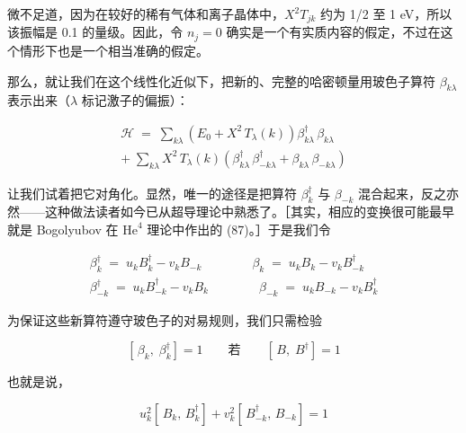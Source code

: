 
微不足道，因为在较好的稀有气体和离子晶体中，$X^{2}T_{jk}$ 约为 1/2 至 1 eV，所以该振幅是 0.1 的量级。因此，令 $n_j = 0$ 确实是一个有实质内容的假定，不过在这个情形下也是一个相当准确的假定。

那么，就让我们在这个线性化近似下，把新的、完整的哈密顿量用玻色子算符 $\beta_{k\lambda}$ 表示出来（$\lambda$ 标记激子的偏振）：

\begin{gather*}
\mathcal{H} \;=\; \sum_{k\lambda} \left(E_0 + X^{2}\,T_{\lambda}(k)\right) \beta_{k\lambda}^{\dagger}\,\beta_{k\lambda} \\
+\;\sum_{k\lambda} X^{2}\,T_{\lambda}(k)\left(\beta_{k\lambda}^{\dagger}\,\beta_{-k\lambda}^{\dagger} + \beta_{k\lambda}\,\beta_{-k\lambda}\right) \tag{17}
\end{gather*}

让我们试着把它对角化。显然，唯一的途径是把算符 $\beta_k^{\dagger}$ 与 $\beta_{-k}$ 混合起来，反之亦然——这种做法读者如今已从超导理论中熟悉了。［其实，相应的变换很可能最早就是 Bogolyubov 在 $\mathrm{He}^{4}$ 理论中作出的 (87)。］于是我们令

\begin{gather*}
\beta_k^{\dagger} \;=\; u_k B_k^{\dagger} - v_k B_{-k} \qquad\qquad \beta_k \;=\; u_k B_k - v_k B_{-k}^{\dagger} \\
\beta_{-k}^{\dagger} \;=\; u_k B_{-k}^{\dagger} - v_k B_k \qquad\qquad \beta_{-k} \;=\; u_k B_{-k} - v_k B_k^{\dagger}
\end{gather*}

为保证这些新算符遵守玻色子的对易规则，我们只需检验

\begin{equation*}
\left[\,\beta_k,\;\beta_k^{\dagger}\right] = 1 \qquad\text{若}\qquad \left[\,B,\;B^{\dagger}\right] = 1
\end{equation*}

也就是说，

\begin{equation*}
u_k^{2}\left[\,B_k,\,B_k^{\dagger}\right] + v_k^{2}\left[\,B_{-k}^{\dagger},\,B_{-k}\right] = 1
\end{equation*}

